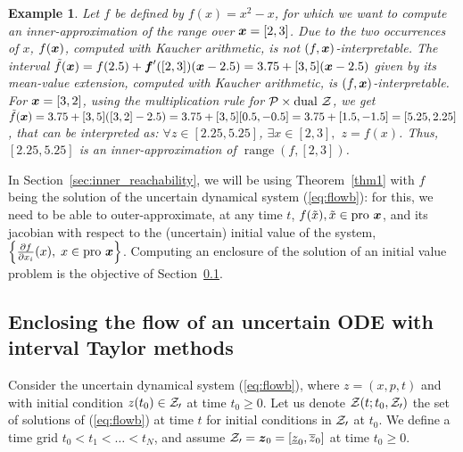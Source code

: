 \documentclass{sig-alternate-05-2015} %
\newtheorem{example}{Example}
\DeclareMathOperator{\range}{range}
\newcommand{\dual}{\mbox{dual }}
\newcommand{\pro}{\mbox{pro }}
\begin{document}
\begin{example}
Let $f$ be defined by $f(x)=x^2-x$, for which we want to compute an inner-approximation of the range over $\x=[2,3]$. Due to the
two occurrences of $x$, $f(\x)$, computed with Kaucher arithmetic, 
is not  $(f,\x)$-interpretable. The interval $\tilde{f}(\x) = f(2.5) + \f'([2,3]) (\x - 2.5)=3.75 + [3,5](\x - 2.5)$
given by its mean-value extension, computed with Kaucher arithmetic, is $(f,\x)$-interpretable. 
For  $\x=[3,2]$, using the multiplication rule for ${\cal P} \times \dual {\cal Z}$, we get 
$\tilde{f}(\x) = 3.75 + [3,5]([3,2] - 2.5)=  3.75 + [3,5] [0.5,-0.5] = 3.75 + [1.5,-1.5] = [5.25,2.25]$, that can be interpreted 
as: $\forall z \in [2.25,5.25]$, $\exists x \in [2,3],$  $z=f(x)$. Thus, $[2.25,5.25]$ is an inner-approximation of $\range(f,[2,3])$.
\end{example}

In Section~\ref{sec:inner_reachability}, we will be using Theorem~\ref{thm1} with $f$ being the solution of the uncertain dynamical system 
(\ref{eq:flowb}): for this, we need to be able to outer-approximate, at any time $t$, $f(\tilde x), \tilde x \in \pro \x$, 
and its jacobian with respect to the (uncertain) initial value of the system, $\left\{ \frac{\partial f}{\partial x_i} (x), \; x \in \pro \x \right\}$.
Computing an enclosure of the solution of an initial value problem is the objective of Section~\ref{sec:Taylor}.  

\subsection{Enclosing the flow of an uncertain ODE with interval Taylor methods}
\label{sec:Taylor}
Consider the uncertain dynamical system (\ref{eq:flowb}), where $z=(x,p,t)$ and with initial condition 
$z(t_0) \in {\cal Z_0}$ at time $t_0 \geq 0$. Let us denote ${\cal Z}(t;t_0, {\cal Z_0})$ the set of solutions of  (\ref{eq:flowb}) 
at time $t$ for initial conditions in ${\cal Z_0}$ at $t_0$. We define a time grid $t_0 < t_1 < \ldots < t_N$, and assume
${\cal Z_0} = \z_0=[\underline{z}_0,\overline{z}_0]$ at time $t_0 \geq 0$. 
\end{document}
